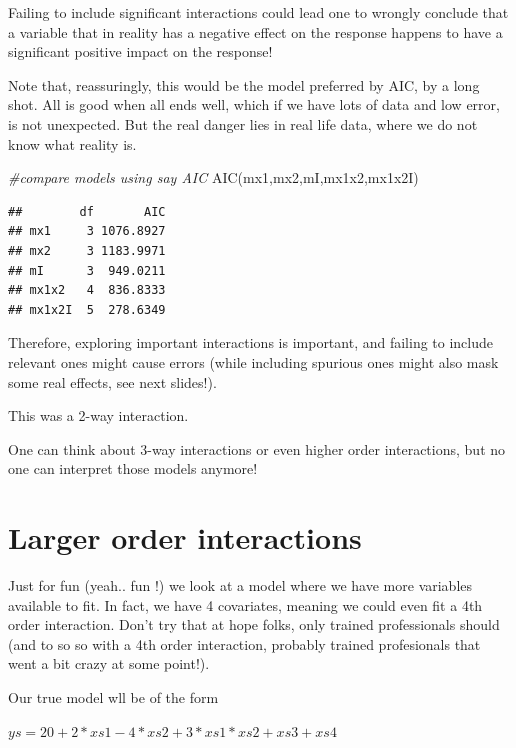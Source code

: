 \documentclass[
]{book}
\newenvironment{Shaded}{\begin{snugshade}}{\end{snugshade}}
\newcommand{\CommentTok}[1]{\textcolor[rgb]{0.56,0.35,0.01}{\textit{#1}}}
\newcommand{\FunctionTok}[1]{\textcolor[rgb]{0.00,0.00,0.00}{#1}}
\newcommand{\NormalTok}[1]{#1}
\begin{document}
Failing to include significant interactions could lead one to wrongly conclude that a variable that in reality has a negative effect on the response happens to have a significant positive impact on the response!

Note that, reassuringly, this would be the model preferred by AIC, by a long shot. All is good when all ends well, which if we have lots of data and low error, is not unexpected. But the real danger lies in real life data, where we do not know what reality is.

\begin{Shaded}
\begin{Highlighting}[]
\CommentTok{\#compare models using say AIC}
\FunctionTok{AIC}\NormalTok{(mx1,mx2,mI,mx1x2,mx1x2I)}
\end{Highlighting}
\end{Shaded}

\begin{verbatim}
##        df       AIC
## mx1     3 1076.8927
## mx2     3 1183.9971
## mI      3  949.0211
## mx1x2   4  836.8333
## mx1x2I  5  278.6349
\end{verbatim}

Therefore, exploring important interactions is important, and failing to include relevant ones might cause errors (while including spurious ones might also mask some real effects, see next slides!).

This was a 2-way interaction.

One can think about 3-way interactions or even higher order interactions, but no one can interpret those models anymore!

\hypertarget{larger-order-interactions}{%
\section{Larger order interactions}\label{larger-order-interactions}}

Just for fun (yeah.. fun !) we look at a model where we have more variables available to fit. In fact, we have 4 covariates, meaning we could even fit a 4th order interaction. Don't try that at hope folks, only trained professionals should (and to so so with a 4th order interaction, probably trained profesionals that went a bit crazy at some point!).

Our true model wll be of the form

\(ys=20+2*xs1-4*xs2+3*xs1*xs2+xs3+xs4\)
\end{document}
